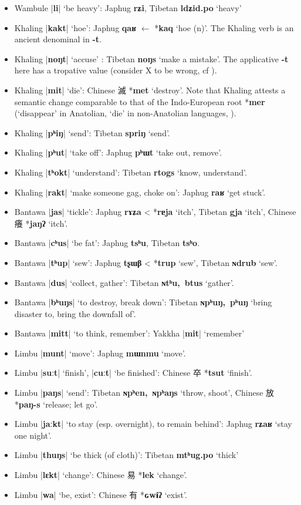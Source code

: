 \documentclass[oneside,a4paper,11pt]{article}
\newcommand{\ipa}[1]{\textbf{{\phon\mbox{#1}}}} %
\newcommand{\zh}[1]{{\cn #1}}
\newcommand{\dhatu}[2]{|\ipa{#1}| `#2'}
\begin{document}
\begin{itemize}
\item Wambule \dhatu{li}{be heavy}: Japhug \ipa{rʑi}, Tibetan \ipa{ldʑid.po} `heavy'
\item Khaling \dhatu{kakt}{hoe}: Japhug \ipa{qaʁ} $\leftarrow$ *\ipa{kaq} `hoe (n)'. The Khaling verb is an ancient denominal in \ipa{-t}.
\item Khaling \dhatu{noŋt}{accuse} : Tibetan \ipa{noŋs} `make a mistake'. The applicative \ipa{-t} here has a tropative value (consider X to be wrong, cf \citealt{jacques13tropative}).
\item Khaling \dhatu{mit}{die}: Chinese \zh{滅} *\ipa{met} `destroy'. Note that Khaling attests a semantic change comparable to that of the Indo-European root *\ipa{mer} (`disappear' in Anatolian, `die' in non-Anatolian languages, \citealt[439-440]{liv}).
\item Khaling \dhatu{pʰiŋ}{send}: Tibetan \ipa{spriŋ} `send'.
\item Khaling \dhatu{pʰut}{take off}: Japhug \ipa{pʰɯt} `take out, remove'.
\item Khaling \dhatu{tʰokt}{understand}: Tibetan \ipa{rtogs} `know, understand'.
\item Khaling \dhatu{rakt}{make someone gag, choke on}: Japhug \ipa{raʁ} `get stuck'.
\item Bantawa \dhatu{jas}{tickle}: Japhug \ipa{rɤʑa} < *\ipa{rɐja} `itch', Tibetan \ipa{gja} `itch', Chinese \zh{癢} *\ipa{jaŋʔ} `itch'.
\item Bantawa \dhatu{cʰus}{be fat}: Japhug \ipa{tsʰu}, Tibetan \ipa{tsʰo}.
\item Bantawa \dhatu{tʰup}{sew}: Japhug \ipa{tʂɯβ} < *\ipa{trup} `sew', Tibetan \ipa{ɴdrub} `sew'.
\item Bantawa \dhatu{dus}{collect, gather}: Tibetan \ipa{ɴtʰu, btus} `gather'.
\item Bantawa \dhatu{bʰuŋs}{to destroy, break down}: Tibetan \ipa{ɴpʰuŋ, pʰuŋ} `bring disaster to, bring the downfall of'.
\item Bantawa \dhatu{mitt}{to think, remember}: Yakkha \dhatu{mit}{remember}
\item Limbu \dhatu{munt}{move}: Japhug \ipa{mɯnmu} `move'.
\item Limbu \dhatu{suːt}{finish}, \dhatu{cuːt}{be finished}: Chinese \zh{卒} *\ipa{tsut} `finish'.
\item Limbu \dhatu{paŋs}{send}: Tibetan \ipa{ɴpʰen, ɴpʰaŋs} `throw, shoot', Chinese \zh{放} *\ipa{paŋ-s} `release; let go'.
\item Limbu \dhatu{jaːkt}{to stay (esp. overnight), to remain behind}: Japhug \ipa{rʑaʁ} `stay one night'.
\item Limbu \dhatu{thuŋs}{be thick (of cloth)}: Tibetan \ipa{mtʰug.po} `thick'
\item Limbu \dhatu{lɛkt}{change}: Chinese \zh{易} *\ipa{lek} `change'.
\item Limbu \dhatu{wa}{be, exist}: Chinese \zh{有} *\ipa{ɢwɨʔ} `exist'.
\end{itemize}
 


\end{document}
